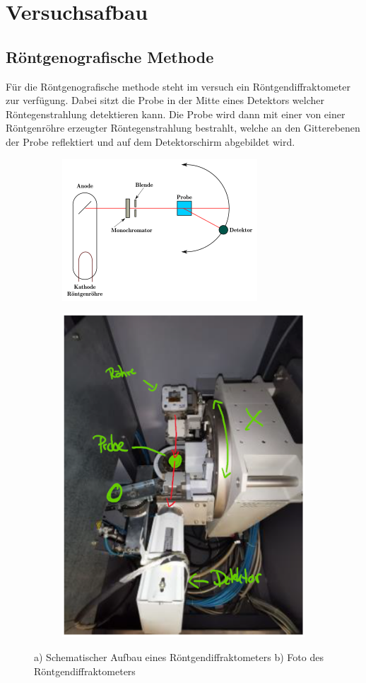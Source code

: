 \section{Versuchsafbau}
    \subsection*{Röntgenografische Methode}
    Für die Röntgenografische methode steht im versuch ein Röntgendiffraktometer zur verfügung.
    Dabei sitzt die Probe in der Mitte eines Detektors welcher Röntegenstrahlung detektieren kann.
    Die Probe wird dann mit einer von einer Röntgenröhre erzeugter Röntegenstrahlung bestrahlt, welche
    an den Gitterebenen der Probe reflektiert und auf dem Detektorschirm abgebildet wird.
    \begin{figure}[H]
        \centering
        \begin{subfigure}{.5\textwidth}
        \centering
        \includegraphics[width=.8\linewidth]{images/diffraktometer.png}
        \caption{}
        \label{fig:sub1}
        \end{subfigure}%
        \begin{subfigure}{.5\textwidth}
        \centering
        \includegraphics[width=.6\linewidth]{images/diffraktometer_pic.png}
        \caption{}
        \label{fig:sub2}
        \end{subfigure}
        \caption{a) Schematischer Aufbau eines Röntgendiffraktometers b) Foto des Röntgendiffraktometers}
        \label{fig:test}
    \end{figure}
